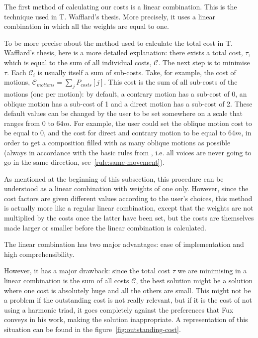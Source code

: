 The first method of calculating our costs is a linear combination. This is the technique used in T. Wafflard's thesis. More precisely, it uses a linear combination in which all the weights are equal to one.



To be more precise about the method used to calculate the total cost in T. Wafflard's thesis, here is a more detailed explanation: there exists a total cost, $\tau$, which is equal to the sum of all individual costs, $\mathcal{C}$. The next step is to minimise $\tau$. Each $\mathcal{C}_i$ is usually itself a sum of sub-costs. Take, for example, the cost of motions, $\mathcal{C}_{motions} = \sum_j P_{costs}[j] $. This cost is the sum of all sub-costs of the motions (one per motion): by default, a contrary motion has a sub-cost of 0, an oblique motion has a sub-cost of 1 and a direct motion has a sub-cost of 2. These default values can be changed by the user to be set somewhere on a scale that ranges from $0$ to $64m$. For example, the user could set the oblique motion cost to be equal to $0$, and the cost for direct and contrary motion to be equal to $64m$, in order to get a composition filled with as many oblique motions as possible (always in accordance with the basic rules from \gap, i.e. all voices are never going to go in the same direction, see~\ref{rule:same-movement}).

As mentioned at the beginning of this subsection, this procedure can be understood as a linear combination with weights of one only. However, since the cost factors are given different values according to the user's choices, this method is actually more like a regular linear combination, except that the weights are not multiplied by the costs once the latter have been set, but the costs are themselves made larger or smaller before the linear combination is calculated.

The linear combination has two major advantages: ease of implementation and high comprehensibility.


However, it has a major drawback: since the total cost $\tau$ we are minimising in a linear combination is the sum of all costs $\mathcal{C}$, the best solution might be a solution where one cost is absolutely huge and all the others are small. This might not be a problem if the outstanding cost is not really relevant, but if it is the cost of not using a harmonic triad, it goes completely against the preferences that Fux conveys in his work, making the solution inappropriate. A representation of this situation can be found in the figure~\ref{fig:outstanding-cost}.

